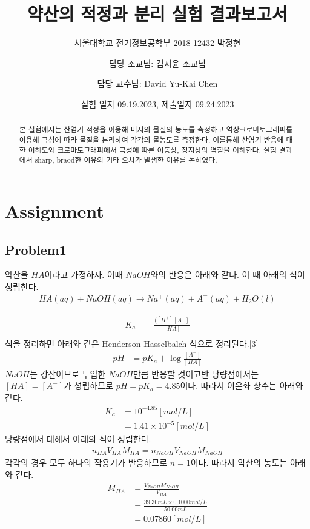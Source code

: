\documentclass[%
 reprint,
 amsmath,amssymb,
 aps,
]{revtex4-2}
\begin{document}
\title{약산의 적정과 분리 실험 결과보고서}

\author{서울대학교 전기정보공학부 2018-12432 박정현}
\date{실험 일자 09.19.2023, 제출일자 09.24.2023}%
\author{담당 조교님: 김지윤 조교님}
\author{담당 교수님: David Yu-Kai Chen}

\begin{abstract}
본 실험에서는 산염기 적정을 이용해 미지의 물질의 농도를 측정하고 역상크로마토그래피를 이용해 극성에 따라 물질을 분리하여 각각의 몰농도를 측정한다. 이를통해 산염기 반응에 대한 이해도와 크로마토그래피에서 극성에 따른 이동상, 정지상의 역할을 이해한다. 실험 결과에서 sharp, braod한 이유와 기타 오차가 발생한 이유를 논하였다.
\end{abstract}

\maketitle


\section{\label{sec:level1}Assignment}
\subsection{\label{sec:level2}Problem1}
약산을 $HA$이라고 가정하자. 이때 $NaOH$와의 반응은 아래와 같다. 이 때 아래의 식이 성립한다.
\begin{align}
	HA(aq) + NaOH(aq) \rightarrow Na^{+}(aq) + A^{-}(aq) + H_{2}O(l)
\end{align}

\begin{align}
	K_{a} &= \frac{([H^{+}][A^{-}]}{[HA]}\\
\end{align}
식을 정리하면 아래와 같은 Henderson-Hasselbalch 식으로 정리된다.[3]
\begin{align}
	pH &= pK_{a} + \log \frac{[A^{-}]}{[HA]}
\end{align}
$NaOH$는 강산이므로 투입한 $NaOH$만큼 반응할 것이고반 당량점에서는  $[HA] = [A^{-}]$가 성립하므로 $pH = pK_{a} = 4.85$이다. 따라서 이온화 상수는 아래와 같다.
\begin{align}
	K_{a} &= 10^{-4.85}[mol/L]\\
	&=1.41 \times 10^{-5}[mol/L]
\end{align}
당량점에서 대해서 아래의 식이 성립한다.
\begin{align}
	n_{HA}V_{HA}M_{HA} = n_{NaOH}V_{NaOH}M_{NaOH}
\end{align}
각각의 경우 모두 하나의 작용기가 반응하므로 $n=1$이다. 따라서 약산의 농도는 아래와 같다.
\begin{align}
	M_{HA} &= \frac{V_{NaOH}M_{NaOH}}{V_{HA}}\\
	&=\frac{39.30mL \times 0.1000mol/L}{50.00mL}\\
	&= 0.07860 [mol/L]
\end{align}
\end{document}
